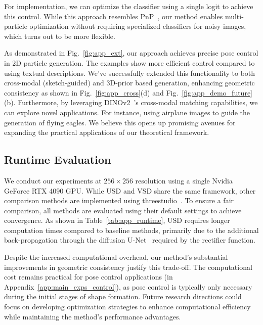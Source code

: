 For implementation, we can optimize the classifier using a single logit to achieve this control. While this approach resembles PnP~\citep{graikos2022diffusion}, our method enables multi-particle optimization without requiring specialized classifiers for noisy images, which turns out to be more flexible.






As demonstrated in Fig.~\ref{fig:app_ext}, our approach achieves precise pose control in 2D particle generation. The examples show more efficient control compared to using textual descriptions. We've successfully extended this functionality to both cross-modal (sketch-guided) and 3D-prior based generation, enhancing geometric consistency as shown in Fig.~\ref{fig:app_cross}(d) and Fig.~\ref{fig:app_demo_future}(b). Furthermore, by leveraging DINOv2~\citep{oquab2023dinov2}'s cross-modal matching capabilities, we can explore novel applications. For instance, using airplane images to guide the generation of flying eagles. We believe this opens up promising avenues for expanding the practical applications of our theoretical framework.











\subsection{Runtime Evaluation}\label{app:main_exps_runtime}

We conduct our experiments at $256\times256$ resolution using a single Nvidia GeForce RTX 4090 GPU. While USD and VSD share the same framework, other comparison methods are implemented using threestudio~\citep{threestudio2023}. To ensure a fair comparison, all methods are evaluated using their default settings to achieve convergence. As shown in Table~\ref{tab:app_runtime}, USD requires longer computation times compared to baseline methods, primarily due to the additional back-propagation through the diffusion U-Net~\citep{ronneberger2015u} required by the rectifier function.

Despite the increased computational overhead, our method's substantial improvements in geometric consistency justify this trade-off. The computational cost remains practical for pose control applications (in Appendix~\ref{app:main_exps_control}), as pose control is typically only necessary during the initial stages of shape formation. Future research directions could focus on developing optimization strategies to enhance computational efficiency while maintaining the method's performance advantages.



